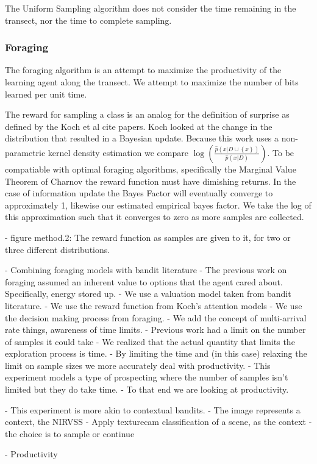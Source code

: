 The Uniform Sampling algorithm does not consider the time remaining in the
transect, nor the time to complete sampling.

\subsubsection{Foraging}

The foraging algorithm is an attempt to maximize the productivity of the learning agent along the transect.  We attempt to maximize the number of bits learned per unit time.

The reward for sampling a class is an analog for the definition of surprise as
defined by the Koch et al {cite papers}.  Koch looked at the change in the
distribution that resulted in a Bayesian update.  Because this work uses a
non-parametric kernel density estimation we compare
$\log\left(\frac{\hat{p}(x|D\cup \left\{x\right\})}{\hat{p}(x|D)}\right)$.  To
be compatiable with optimal foraging algorithms, specifically the Marginal
Value Theorem of Charnov \cite{charnov1973optimal} the reward function must
have dimishing returns.  In the case of information update the Bayes Factor
will eventually converge to approximately 1, likewise our estimated empirical
bayes factor.  We take the log of this approximation such that it converges to
zero as more samples are collected.


	- figure method.2: The reward function as samples are given to it, for two or three different distributions.

	- Combining foraging models with bandit literature 
		- The previous work on foraging assumed an inherent value to
			options that the agent cared about.  Specifically, energy stored up.
		- We use a valuation model taken from bandit literature.  
		- We use the reward function from Koch's attention models
		- We use the decision making process from foraging. 
		- We add the concept of multi-arrival rate things, awareness of time limits.
	- Previous work had a limit on the number of samples it could take
		- We realized that the actual quantity that limits the exploration process
			is time.
		- By limiting the time and (in this case) relaxing the limit on sample sizes we more accurately deal with productivity.  
	- This experiment models a type of prospecting where the number of samples isn't limited but they do take time. 
	- To that end we are looking at productivity.

	-  This experiment is more akin to contextual bandits.  
	- The image represents a context, the NIRVSS 
	- Apply texturecam classification of a scene, as the context
	- the choice is to sample or continue

	- Productivity 



